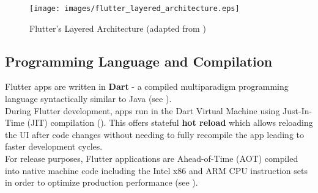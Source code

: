 \begin{figure}
    \centering
    \texttt{[image: images/flutter\_layered\_architecture.eps]}
    \caption{Flutter's Layered Architecture (adapted from \cite{FlutterArchitecture2021})}
    \label{fig:flutter_layered_architecture}
\end{figure}


\subsection{Programming Language and Compilation}
Flutter apps are written in \textbf{Dart} - a compiled multiparadigm programming language syntactically similar to Java (see \cite{DartLanguage2021}).\\
During Flutter development, apps run in the Dart Virtual Machine using Just-In-Time (JIT) compilation (\cite{DartLanguage2021}). 
This offers stateful \textbf{hot reload} which allows reloading the UI after code changes without needing to fully recompile the app leading to faster development cycles.\\
For release purposes, Flutter applications are Ahead-of-Time (AOT) compiled into native machine code including the Intel x86 and ARM CPU instruction sets in order to optimize production performance
(see \cite{FlutterArchitecture2021}).


